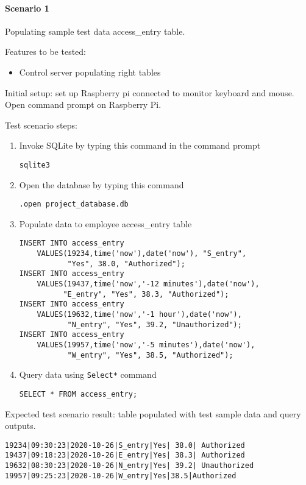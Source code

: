 \paragraph{Scenario 1}
Populating sample test data access\_entry table.

\noindent
Features to be tested:
\begin{itemize}
    \item Control server populating right tables
\end{itemize}

\noindent
Initial setup: set up Raspberry pi connected to monitor keyboard and mouse.
Open command prompt on Raspberry Pi.

\noindent
Test scenario steps:
\begin{enumerate}
    \item Invoke SQLite by typing this command in the command prompt
\begin{lstlisting}
sqlite3
\end{lstlisting}
    \item Open the database by typing this command 
\begin{lstlisting}
.open project_database.db
\end{lstlisting}
    \item Populate data to employee access\_entry table 
\begin{lstlisting}
INSERT INTO access_entry
    VALUES(19234,time('now'),date('now'), "S_entry",
           "Yes", 38.0, "Authorized");
INSERT INTO access_entry
    VALUES(19437,time('now','-12 minutes'),date('now'),
          "E_entry", "Yes", 38.3, "Authorized");
INSERT INTO access_entry
    VALUES(19632,time('now','-1 hour'),date('now'),
           "N_entry", "Yes", 39.2, "Unauthorized");
INSERT INTO access_entry
    VALUES(19957,time('now','-5 minutes'),date('now'),
           "W_entry", "Yes", 38.5, "Authorized");
\end{lstlisting}
    \item Query data using \lstinline{Select*} command
\begin{lstlisting}
SELECT * FROM access_entry; 
\end{lstlisting}
\end{enumerate}

\noindent
Expected test scenario result: table populated with test sample data and query
outputs.

\begin{lstlisting}
19234|09:30:23|2020-10-26|S_entry|Yes| 38.0| Authorized
19437|09:18:23|2020-10-26|E_entry|Yes| 38.3| Authorized
19632|08:30:23|2020-10-26|N_entry|Yes| 39.2| Unauthorized
19957|09:25:23|2020-10-26|W_entry|Yes|38.5|Authorized
\end{lstlisting}

